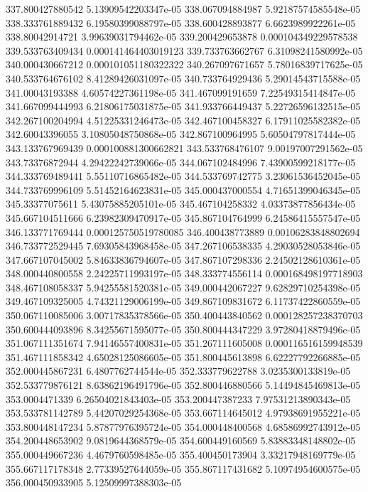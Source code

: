 {337.800427880542 5.13909542203347e-05
338.067094884987 5.92187574585548e-05
338.333761889432 6.19580399088797e-05
338.600428893877 6.6623989922261e-05
338.80042914721 3.99639031794462e-05
339.200429653878 0.000104349229578538
339.533763409434 0.000141464403019123
339.733763662767 6.31098241580992e-05
340.000430667212 0.000101051180322322
340.267097671657 5.78016839717625e-05
340.533764676102 8.41289426031097e-05
340.733764929436 5.29014543715588e-05
341.00043193388 4.60574227361198e-05
341.467099191659 7.22549315414847e-05
341.667099444993 6.21806175031875e-05
341.933766449437 5.22726596132515e-05
342.267100204994 4.51225331246473e-05
342.467100458327 6.17911025582382e-05
342.60043396055 3.10805048750868e-05
342.867100964995 5.60504797817444e-05
343.133767969439 0.000100881300662821
343.533768476107 9.00197007291562e-05
343.73376872944 4.29422242739066e-05
344.067102484996 7.43900599218177e-05
344.333769489441 5.55110716865482e-05
344.533769742775 3.23061536452045e-05
344.733769996109 5.51452164623831e-05
345.000437000554 4.71651399046345e-05
345.33377075611 5.43075885205101e-05
345.467104258332 4.03373877856434e-05
345.667104511666 6.23982309470917e-05
345.867104764999 6.24586415557547e-05
346.133771769444 0.000125750519780085
346.400438773889 0.00106283848802694
346.733772529445 7.69305843968458e-05
347.267106538335 4.29030528053846e-05
347.667107045002 5.84633836794607e-05
347.867107298336 2.24502128610361e-05
348.000440800558 2.24225711993197e-05
348.333774556114 0.000168498197718903
348.467108058337 5.94255581520381e-05
349.000442067227 9.62829710254398e-05
349.467109325005 4.74321129006199e-05
349.867109831672 6.11737422860559e-05
350.067110085006 3.00717835378566e-05
350.400443840562 0.000128257238370703
350.600444093896 8.34255671595077e-05
350.800444347229 3.97280418879496e-05
351.067111351674 7.94146557400831e-05
351.267111605008 0.000116516159948539
351.467111858342 4.65028125086605e-05
351.800445613898 6.62227792266885e-05
352.000445867231 6.4807762744544e-05
352.333779622788 3.0235300133819e-05
352.533779876121 8.63862196491796e-05
352.800446880566 5.14494845469813e-05
353.0004471339 6.26504021843403e-05
353.200447387233 7.97531213890343e-05
353.533781142789 5.44207029254368e-05
353.667114645012 4.97938691955221e-05
353.800448147234 5.87877976395724e-05
354.000448400568 4.68586992743912e-05
354.200448653902 9.0819644368579e-05
354.600449160569 5.83883348148802e-05
355.000449667236 4.4679760598485e-05
355.400450173904 3.33217948169779e-05
355.667117178348 2.77339527644059e-05
355.867117431682 5.10974954600575e-05
356.000450933905 5.12509997388303e-05
}
